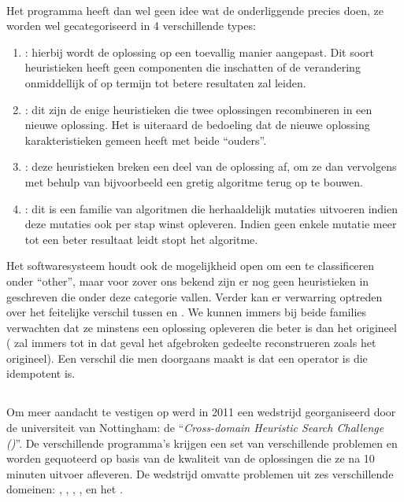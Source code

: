 \paragraph{}
Het programma heeft dan wel geen idee wat de onderliggende \abllhn{} precies doen, ze worden wel gecategoriseerd in 4 verschillende types:
\begin{enumerate}
 \item \emph{\abmt{}}: hierbij wordt de oplossing op een toevallig manier aangepast. Dit soort heuristieken heeft geen componenten die inschatten of de verandering onmiddellijk of op termijn tot betere resultaten zal leiden.
 \item \emph{\abco{}}: dit zijn de enige heuristieken die twee oplossingen recombineren in een nieuwe oplossing. Het is uiteraard de bedoeling dat de nieuwe oplossing karakteristieken gemeen heeft met beide ``ouders''.
 \item \emph{\abrr{}}: deze heuristieken breken een deel van de oplossing af, om ze dan vervolgens met behulp van bijvoorbeeld een gretig algoritme terug op te bouwen.
 \item \emph{\abls{}}: dit is een familie van algoritmen die herhaaldelijk mutaties uitvoeren indien deze mutaties ook per stap winst opleveren. Indien geen enkele mutatie meer tot een beter resultaat leidt stopt het algoritme.
\end{enumerate}
Het softwaresysteem houdt ook de mogelijkheid open om een \abllh{} te classificeren onder ``other'', maar voor zover ons bekend zijn er nog geen heuristieken in \abhf{} geschreven die onder deze categorie vallen. Verder kan er verwarring optreden over het feitelijke verschil tussen \abrr{} en \abls{}. We kunnen immers bij beide families verwachten dat ze minstens een oplossing opleveren die beter is dan het origineel (\abrr{} zal immers tot in dat geval het afgebroken gedeelte reconstrueren zoals het origineel). Een verschil die men doorgaans maakt is dat \abls{} een operator is die idempotent is.

\subsection{\abchescy{}}

Om meer aandacht te vestigen op \abhf{} werd in 2011 een wedstrijd georganiseerd door de universiteit van Nottingham: de ``\emph{Cross-domain Heuristic Search Challenge (\abchescy)}''\cite{Burke:2011:CHS:2177360.2177415}. De verschillende programma's krijgen een set van verschillende problemen en worden gequoteerd op basis van de kwaliteit van de oplossingen die ze na 10 minuten uitvoer afleveren.%
De wedstrijd omvatte problemen uit zes verschillende domeinen: , , , ,  en het .

